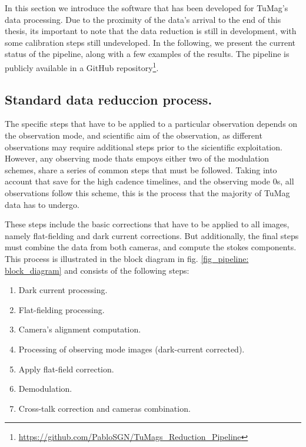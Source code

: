 In this section we introduce the software that has been developed for TuMag's data processing. Due to the proximity of the data's arrival to the end of this thesis, its important to note that the data reduction is still in development, with some calibration steps still undeveloped. In the following, we present the current status of the pipeline, along with a few examples of the results. The pipeline is publicly available in a GitHub repository\footnote{\url{https://github.com/PabloSGN/TuMags_Reduction_Pipeline}}.  

\subsection{Standard data reduccion process.}

The specific steps that have to be applied to a particular observation depends on the observation mode, and scientific aim of the observation, as different observations may require additional steps prior to the sicientific exploitation. However, any observing mode thats empoys either two of the modulation schemes, share a series of common steps that must be followed. Taking into account that save for the high cadence timelines, and the observing mode 0s, all observations follow this scheme, this is the process that the majority of TuMag data has to undergo. 

These steps include the basic corrections that have to be applied to all images, namely flat-fielding and dark current corrections. But additionally, the final steps must combine the data from both cameras, and compute the stokes components. This process is illustrated in the block diagram in fig. \ref{fig_pipeline: block_diagram} and consists of the following steps:
\begin{enumerate}
  \item Dark current processing. 
  \item Flat-fielding processing.
  \item Camera's alignment computation. 
  \item Processing of observing mode images (dark-current corrected). 
  \item Apply flat-field correction.
  \item Demodulation. 
  \item Cross-talk correction and cameras combination.
  \end{enumerate}

